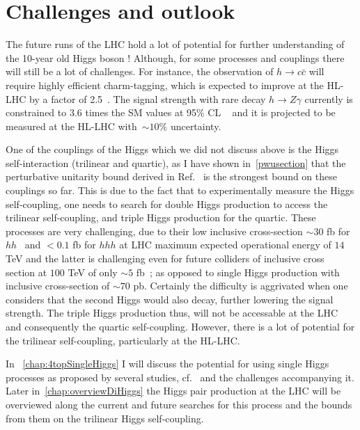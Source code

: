 \section{Challenges and outlook \label{sec:Higgscouplchallenge} }
\par The future runs of the LHC  hold a lot of potential for further understanding of the 10-year old Higgs boson ! Although, for some processes and couplings there will still be a lot of challenges. For instance, the observation of $h \to c \bar{c}$ will require highly efficient charm-tagging, which is expected to improve at the HL-LHC by a factor of 2.5~\cite{ATL-PHYS-PUB-2018-016}.  The signal strength with rare decay $ h \to Z \gamma$ currently is constrained to $3.6$ times the SM values at 95\% CL ~\cite{ATLAS:2020qcv} and it is projected to be measured at the HL-LHC with~$\sim 10\%$ uncertainty. 
\par One of the couplings of the Higgs which we did not discuss above is the Higgs self-interaction (trilinear and quartic), as I have shown in~\autoref{pwusection} that the perturbative unitarity bound derived in Ref.~\cite{DiLuzio:2017tfn}  is the strongest bound on these couplings so far. This is due to the fact that to experimentally measure the Higgs self-coupling, one needs to search for double Higgs  production to access the trilinear self-coupling, and triple Higgs production for the quartic. These processes are very challenging, due to their low inclusive cross-section $\sim 30$ fb for~$hh$~\cite{Dawson:1998py} and $<0.1$ fb for $hhh$ at LHC maximum expected operational energy of $14$ TeV and the latter is challenging even for future colliders of inclusive cross section at $100$ TeV of only $\sim 5$ fb~\cite{Papaefstathiou:2015paa}; as opposed to single Higgs production with inclusive cross-section of $\sim 70$ pb. Certainly the difficulty is aggrivated when one considers that the second Higgs would also decay, further lowering the signal strength. The triple Higgs production thus, will not be accessable at the LHC and consequently the quartic self-coupling. However, there is a lot of potential for the trilinear self-coupling, particularly at the HL-LHC. 
\par In ~\autoref{chap:4topSingleHiggs} I will discuss the potential for using single Higgs processes as proposed by several studies, cf.~ \cite{McCullough:2013rea, Gorbahn:2016uoy, Degrassi:2016wml, Bizon:2016wgr, Maltoni:2017ims, Degrassi:2019yix, Degrassi:2021uik, Haisch:2021hvy} and the challenges accompanying it. Later in~\autoref{chap:overviewDiHiggs} the Higgs pair production at the LHC will be overviewed along the current and future searches for this process and the bounds from them on the trilinear Higgs self-coupling. 
